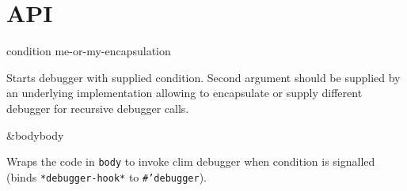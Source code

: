 \section{API}

 {condition me-or-my-encapsulation}

Starts debugger with supplied condition. Second argument should be
supplied by an underlying implementation allowing to encapsulate or
supply different debugger for recursive debugger calls.

 {&bodybody }

Wraps the code in \texttt{body} to invoke clim debugger when condition
is signalled (binds \texttt{*debugger-hook*} to \texttt{#'debugger}).
